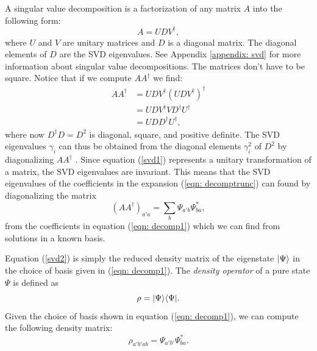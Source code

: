 A singular value decomposition is a factorization of any matrix $A$ into the following
form:
\begin{equation}
    A = UDV^\dagger,
\end{equation}
where $U$ and $V$ are unitary matrices and $D$ is a diagonal matrix. 
The diagonal elements of $D$ are the SVD eigenvalues. See Appendix
\ref{appendix: svd} for more information about singular value decompositions. 
The matrices don't have to be square. Notice that if we compute $AA^\dagger$ we find:
\begin{equation}\begin{split}\label{svd1}
    AA^\dagger &=   UDV^\dagger   (UDV^\dagger)^\dagger\\
               &=   UDV^\dagger    VD^\dagger U^\dagger \\
               &=  UD D^\dagger U^\dagger,
\end{split}\end{equation}
where now $D^\dagger D =D^2$ is diagonal, square, and positive definite. 
The SVD eigenvalues $\gamma_i$ can thus be obtained from the diagonal elements 
$\gamma_i^2$ of $D^2$ by diagonalizing $AA^\dagger$ . Since equation (\ref{svd1})
represents a unitary transformation of a matrix, the SVD eigenvalues
are invariant. This means that the SVD eigenvalues of the coefficients in the 
expansion (\ref{eqn: decomptrunc}) can found by diagonalizing the matrix  
\begin{equation}\label{svd2}
    (AA^\dagger)_{a'a}=\sum_b\Psi_{a'b}\Psi^*_{ba},
\end{equation} 
from the coefficients in equation (\ref{eqn: decomp1}) which we can find
from solutions in a known basis.

Equation (\ref{svd2}) is simply the reduced density matrix of the eigenstate 
$|\Psi\rangle$ in the choice of basis given in (\ref{eqn: decomp1}). The 
\textit{density operator} of a pure state $\Psi$ is defined as 
\begin{equation}
    \rho = |\Psi\rangle\langle \Psi|.
\end{equation}
Given the choice of basis shown in equation (\ref{eqn: decomp1}), we can compute 
the following density matrix:
\begin{equation}\label{rhoall}
    \rho_{a'b'ab} = {\Psi}_{a'b'}{\Psi}^*_{ba}.
\end{equation} 

